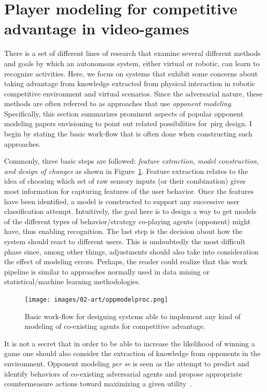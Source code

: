\section{Player modeling for competitive advantage in video-games}\label{compadvantage}
There is a set of different lines of research that examine several different methods and goals by which an autonomous system, either virtual or robotic, can learn to recognize activities. Here, we focus on systems that exhibit some concerns about taking advantage from knowledge extracted from physical interaction in robotic competitive environment and virtual scenarios. Since the adversarial nature, these methods are often referred to as approaches that use \textit{opponent modeling}.  Specifically, this section summarizes prominent aspects of popular opponent modeling papers envisioning to point out related possibilities for~\gls{pirg} design. I begin by stating the basic work-flow that is often done when constructing such approaches. 

Commonly, three basic steps are followed: \textit{feature extraction, model construction, and design of changes} as shown in Figure~\ref{behaviorModWorkFlow}. Feature extraction relates to the idea of choosing which set of raw sensory inputs (or their combination) gives most information for capturing features of the user behavior. Once the features have been identified, a model is constructed to support any successive user classification attempt. Intuitively, the goal here is to design a way to get models of the different types of behavior/strategy co-playing agents (opponent) might have, thus enabling recognition. The last step is the decision about how the system should react to different users. This is undoubtedly the most difficult phase since, among other things, adjustments should also take into consideration the effect of modeling errors. Perhaps, the reader could realize that this work pipeline is similar to approaches normally used in data mining or statistical/machine learning methodologies.

\begin{figure}[htp]
  \centering  
  \texttt{[image: images/02-art/oppmodelproc.png]}
  \caption{Basic work-flow for designing systems able to implement any kind of modeling of co-existing agents for competitive advantage.}
   \label{behaviorModWorkFlow}
\end{figure}

It is not a secret that in order to be able to increase the likelihood of winning a game one should also consider the extraction of knowledge from opponents in the environment. Opponent modeling \textit{per se} is seen as the attempt to predict and identify behaviors of co-existing adversarial agents and propose appropriate countermeasure actions toward maximizing a given utility~\citep{fathzadeh_opponent_2007}.

